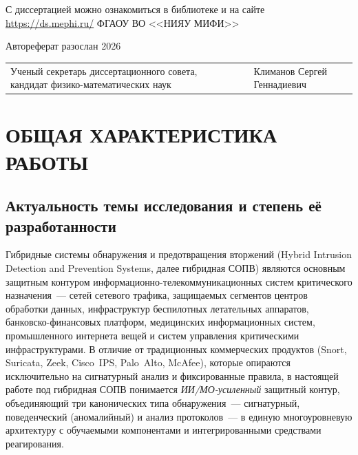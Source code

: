 \documentclass[12pt,a5paper]{article}
\begin{document}
{\vspace{0.15cm}

\noindent С диссертацией можно ознакомиться в библиотеке и на сайте \url{https://ds.mephi.ru/} ФГАОУ ВО <<НИЯУ МИФИ>>

\vspace{0.15cm}

\noindent Автореферат разослан \underline{\hspace{2.5cm}} 2026

\vspace{0.3cm}

\noindent\begin{tabular}{@{}p{4.5cm}p{2cm}p{3.5cm}@{}}
Ученый секретарь диссертационного совета, кандидат физико-математических наук & & Климанов Сергей Геннадиевич \\
\end{tabular}
}

\newpage

\setcounter{page}{3}

\section*{ОБЩАЯ ХАРАКТЕРИСТИКА РАБОТЫ}

\subsection*{Актуальность темы исследования и степень её разработанности}

Гибридные системы обнаружения и предотвращения вторжений
(Hybrid Intrusion Detection and Prevention Systems, далее
гибридная СОПВ) являются основным защитным контуром
информационно-телекоммуникационных систем критического
назначения~--- сетей сетевого трафика, защищаемых сегментов
центров обработки данных, инфраструктур беспилотных летательных
аппаратов, банковско-финансовых платформ, медицинских
информационных систем, промышленного интернета вещей и систем
управления критическими инфраструктурами. В отличие от
традиционных коммерческих продуктов (Snort, Suricata, Zeek,
Cisco~IPS, Palo~Alto, McAfee), которые опираются исключительно
на сигнатурный анализ и фиксированные правила, в настоящей
работе под гибридная СОПВ понимается \emph{ИИ/МО-усиленный}
защитный контур, объединяющий три канонических типа
обнаружения~--- сигнатурный, поведенческий (аномалийный) и
анализ протоколов~--- в единую многоуровневую архитектуру с
обучаемыми компонентами и интегрированными средствами
реагирования.
\end{document}

